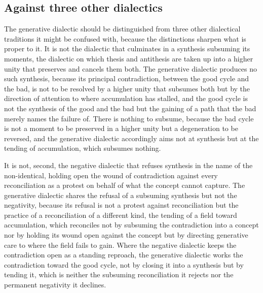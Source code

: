 \subsection{Against three other dialectics}
\label{p22:sub:method-against-others}

The generative dialectic should be distinguished from three other dialectical traditions it might be confused with, because the distinctions sharpen what is proper to it. It is not the dialectic that culminates in a synthesis subsuming its moments, the dialectic on which thesis and antithesis are taken up into a higher unity that preserves and cancels them both. The generative dialectic produces no such synthesis, because its principal contradiction, between the good cycle and the bad, is not to be resolved by a higher unity that subsumes both but by the direction of attention to where accumulation has stalled, and the good cycle is not the synthesis of the good and the bad but the gaining of a path that the bad merely names the failure of. There is nothing to subsume, because the bad cycle is not a moment to be preserved in a higher unity but a degeneration to be reversed, and the generative dialectic accordingly aims not at synthesis but at the tending of accumulation, which subsumes nothing.

It is not, second, the negative dialectic that refuses synthesis in the name of the non-identical, holding open the wound of contradiction against every reconciliation as a protest on behalf of what the concept cannot capture. The generative dialectic shares the refusal of a subsuming synthesis but not the negativity, because its refusal is not a protest against reconciliation but the practice of a reconciliation of a different kind, the tending of a field toward accumulation, which reconciles not by subsuming the contradiction into a concept nor by holding its wound open against the concept but by directing generative care to where the field fails to gain. Where the negative dialectic keeps the contradiction open as a standing reproach, the generative dialectic works the contradiction toward the good cycle, not by closing it into a synthesis but by tending it, which is neither the subsuming reconciliation it rejects nor the permanent negativity it declines.


